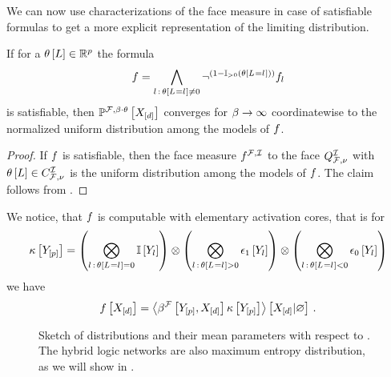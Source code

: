 We can now use characterizations of the face measure in case of satisfiable formulas to get a more explicit representation of the limiting distribution.

\begin{theorem}
    If for a $\theta\left[L\right]\in\mathbb{R}^{p}$ the formula
    \begin{align*}
        f =
        \bigwedge_{l\,:\,\theta\left[L_{}=l_{}\right]\neq0} \lnot^{(1-\mathbb{I}_{>0}\left(\theta\left[L_{}=l_{}\right]\right))} f_{l}
    \end{align*}
    is satisfiable, then $\mathbb{P}^{\mathcal{F},\beta\cdot\theta}\left[X_{[d]}\right]$ converges for $\beta\rightarrow\infty$ coordinatewise to the normalized uniform distribution among the models of $f$.
\end{theorem}
\begin{proof}
    If $f$ is satisfiable, then the face measure $f^{\mathcal{F},\mathcal{I}}$ to the face $Q^{\mathcal{I}}_{\mathcal{F},\nu}$ with $\theta\left[L\right]\in C_{\mathcal{F},\nu}^{\mathcal{I}}$ is the uniform distribution among the models of $f$.
    The claim follows from .
\end{proof}

We notice, that $f$ is computable with elementary activation cores, that is for
\begin{align*}
    \kappa\left[Y_{[p]}\right]
    = \left(\bigotimes_{l\,:\,\theta\left[L_{}=l_{}\right]=0} \mathbb{I}\left[Y_{l}\right]\right)
    \otimes \left(\bigotimes_{l\,:\,\theta\left[L_{}=l_{}\right]>0} \epsilon_1\left[Y_{l}\right]\right)
    \otimes \left(\bigotimes_{l\,:\,\theta\left[L_{}=l_{}\right]<0} \epsilon_0\left[Y_{l}\right]\right)
\end{align*}
we have
\begin{align*}
    f\left[X_{[d]}\right] =
    \left\langle \beta^{\mathcal{F}}\left[Y_{[p]},X_{[d]}\right]\kappa\left[Y_{[p]}\right]\right\rangle \left[ X_{[d]} | \varnothing \right] \, .
\end{align*}



\begin{figure}[t]
    \begin{center}
        
    \end{center}
    \caption{Sketch of distributions and their mean parameters with respect to .
    The hybrid logic networks are also maximum entropy distribution, as we will show in .}
    \label{fig:reproducableSketch}
\end{figure}

